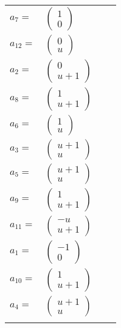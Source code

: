 \documentclass[1p]{elsarticle_modified}
\theoremstyle{definition}
\begin{document}
\begin{tabular}{m{7pt} m{180pt} m{7pt} m{180pt} }
\flushright $a_{7}=$&$\begin{pmatrix}1\\0\end{pmatrix}$ \\
\flushright $a_{12}=$&$\begin{pmatrix}0\\u\end{pmatrix}$ \\
\flushright $a_{2}=$&$\begin{pmatrix}0\\u+1\end{pmatrix}$ \\
\flushright $a_{8}=$&$\begin{pmatrix}1\\u+1\end{pmatrix}$ \\
\flushright $a_{6}=$&$\begin{pmatrix}1\\u\end{pmatrix}$ \\
\flushright $a_{3}=$&$\begin{pmatrix}u+1\\u\end{pmatrix}$ \\
\flushright $a_{5}=$&$\begin{pmatrix}u+1\\u\end{pmatrix}$ \\
\flushright $a_{9}=$&$\begin{pmatrix}1\\u+1\end{pmatrix}$ \\
\flushright $a_{11}=$&$\begin{pmatrix}- u\\u+1\end{pmatrix}$ \\
\flushright $a_{1}=$&$\begin{pmatrix}-1\\0\end{pmatrix}$ \\
\flushright $a_{10}=$&$\begin{pmatrix}1\\u+1\end{pmatrix}$ \\
\flushright $a_{4}=$&$\begin{pmatrix}u+1\\u\end{pmatrix}$\\&\end{tabular}
\end{document}

